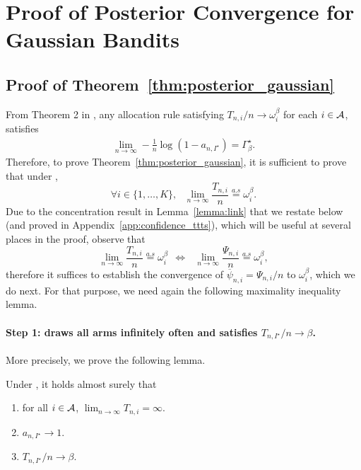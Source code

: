 \section{Proof of Posterior Convergence for Gaussian Bandits}\label{app:posterior_gaussian}

\subsection{Proof of Theorem~\ref{thm:posterior_gaussian}}\label{app:posterior_gaussian.main}

\restateposteriorgaussian*

From Theorem 2 in \cite{qin2017ttei}, any allocation rule satisfying $T_{n, i} / n \rightarrow \omega_i^\beta$ for each $i \in \mathcal{A}$, satisfies 
\begin{align*}
    \lim_{n \rightarrow \infty} - \frac{1}{n} \log(1 - a_{n,I^\star}) = \Gamma_{\beta}^\star.
\end{align*}
Therefore, to prove Theorem~\ref{thm:posterior_gaussian}, it is sufficient to prove that under \TTTS,
\begin{equation}
    \forall i \in \{1,\dots,K\}, \ \ \     \lim_{n\rightarrow\infty} \frac{T_{n,i}}{n}  \overset{a.s}{=} \omega_i^\beta\label{ToProveGaussian}.
\end{equation}
Due to the concentration result in Lemma~\ref{lemma:link} that we restate below (and proved in Appendix~\ref{app:confidence_ttts}), which will be useful at several places in the proof, observe that 
\[
    \lim_{n\rightarrow \infty} \frac{T_{n,i}}{n}  \overset{a.s}{=} \omega_i^\beta \ \ \Leftrightarrow \ \ \ \lim_{n\rightarrow \infty} \frac{\Psi_{n,i}}{n}  \overset{a.s}{=} \omega_i^\beta,
\]
therefore it suffices to establish the convergence of $\overline{\psi}_{n,i} = \Psi_{n,i}/n$ to $\omega_i^\beta$, which we do next. For that purpose, we need again the following maximality inequality lemma.

\restatewtwo*

\paragraph{Step 1: \TTTS draws all arms infinitely often and satisfies $T_{n,I^\star}/n \rightarrow \beta$.} More precisely, we prove the following lemma. 

\begin{lemma}\label{lemma:optimal_prop_istar_gaussian}
	Under \TTTS, it holds almost surely that
	\begin{enumerate}
	    \item for all $i \in \mathcal{A}$, $\lim_{n\rightarrow \infty} T_{n,i} = \infty.$
	    \item $a_{n,I^\star} \rightarrow 1.$
	    \item $T_{n,I^\star}/n \rightarrow \beta$.
	\end{enumerate}
\end{lemma}

